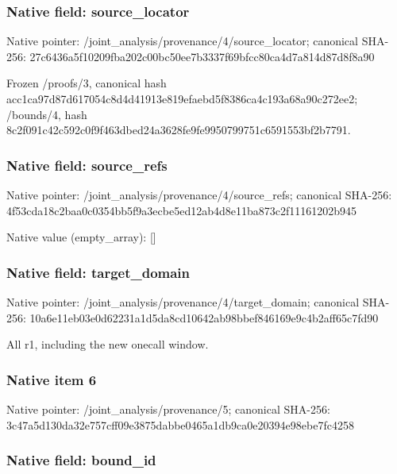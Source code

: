 \documentclass[10pt,a4paper]{article}
\begin{document}
\subsubsection{Native field: source\_locator}


Native pointer: /joint\_analysis/provenan\allowbreak{}ce/4/source\_locator; canonical SHA-256: 27c6436a5f10209fba202c00\allowbreak{}bc50ee7b3337f69bfcc80ca4\allowbreak{}d7a814d87d8f8a90


Frozen /proofs/3, canonical hash acc1ca97d87d617054c8d4d4\allowbreak{}1913e819efaebd5f8386ca4c\allowbreak{}193a68a90c272ee2; /bounds/4, hash 8c2f091c42c592c0f9f463db\allowbreak{}ed24a3628fe9fe9950799751\allowbreak{}c6591553bf2b7791.


\subsubsection{Native field: source\_refs}


Native pointer: /joint\_analysis/provenan\allowbreak{}ce/4/source\_refs; canonical SHA-256: 4f53cda18c2baa0c0354bb5f\allowbreak{}9a3ecbe5ed12ab4d8e11ba87\allowbreak{}3c2f11161202b945



Native value (empty\_array): []



\subsubsection{Native field: target\_domain}


Native pointer: /joint\_analysis/provenan\allowbreak{}ce/4/target\_domain; canonical SHA-256: 10a6e11eb03e0d62231a1d5d\allowbreak{}a8cd10642ab98bbef846169e\allowbreak{}9c4b2aff65c7fd90


All r1, including the new onecall window.


\subsubsection{Native item 6}


Native pointer: /joint\_analysis/provenance/5; canonical SHA-256: 3c47a5d130da32e757cff09e\allowbreak{}3875dabbe0465a1db9ca0e20\allowbreak{}394e98ebe7fc4258



\subsubsection{Native field: bound\_id}
\end{document}
